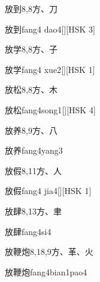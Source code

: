 \begin{entry}{放到}{8,8}{⽅、⼑}
  \begin{phonetics}{放到}{fang4 dao4}[][HSK 3]
  \end{phonetics}
\end{entry}

\begin{entry}{放学}{8,8}{⽅、⼦}
  \begin{phonetics}{放学}{fang4 xue2}[][HSK 1]
  \end{phonetics}
\end{entry}

\begin{entry}{放松}{8,8}{⽅、⽊}
  \begin{phonetics}{放松}{fang4song1}[][HSK 4]
  \end{phonetics}
\end{entry}

\begin{entry}{放养}{8,9}{⽅、⼋}
  \begin{phonetics}{放养}{fang4yang3}
  \end{phonetics}
\end{entry}

\begin{entry}{放假}{8,11}{⽅、⼈}
  \begin{phonetics}{放假}{fang4 jia4}[][HSK 1]
  \end{phonetics}
\end{entry}

\begin{entry}{放肆}{8,13}{⽅、⾀}
  \begin{phonetics}{放肆}{fang4si4}
  \end{phonetics}
\end{entry}

\begin{entry}{放鞭炮}{8,18,9}{⽅、⾰、⽕}
  \begin{phonetics}{放鞭炮}{fang4bian1pao4}
  \end{phonetics}
\end{entry}

